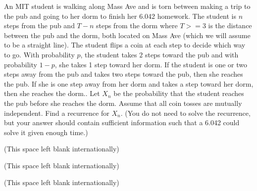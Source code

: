 \documentclass[12pt,oneside]{article}
\begin{document}
\begin{problem}{10}

An MIT student is walking along Mass Ave and is torn between making a trip to the pub and going to her dorm to finish her 6.042 homework.  The student is $n$ steps from the pub and $T-n$ steps from the dorm where $T >=3$ is the distance between the pub and the dorm, both located on Mass Ave (which we will assume to be a straight line).  The student flips a coin at each step to decide which way to go.  With probability $p$, the student takes $2$ steps toward the pub and with probability $1-p$, she takes 1 step toward her dorm.  If the student is one or two steps away from the pub and takes two steps toward the pub, then she reaches the pub.  If she is one step away from her dorm and takes a step toward her dorm, then she reaches the dorm..  Let $X_n$ be the probability that the student reaches the pub before she reaches the dorm.  Assume that all coin tosses are mutually independent.  Find a recurrence for $X_n$. (You do not need to solve the recurrence, but your answer should contain sufficient information such that a 6.042 could solve it given enough time.)
\end{problem}
 


\newpage

\newpage
\begin{center}
(This space left blank internationally)
\end{center}

\newpage
\begin{center}
(This space left blank internationally)
\end{center}

\mbox{}

\newpage
\begin{center}
(This space left blank internationally)
\end{center}

\mbox{}
\end{document}
